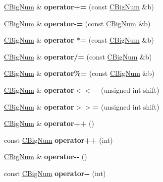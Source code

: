 \begin{DoxyCompactItemize}
\mbox{\hyperlink{class_c_big_num}{C\+Big\+Num}} \& {\bfseries operator+=} (const \mbox{\hyperlink{class_c_big_num}{C\+Big\+Num}} \&b)
\item 
\mbox{\label{class_c_big_num_a4fe724fd22129eefc4e1f34d95505381}} 
\mbox{\hyperlink{class_c_big_num}{C\+Big\+Num}} \& {\bfseries operator-\/=} (const \mbox{\hyperlink{class_c_big_num}{C\+Big\+Num}} \&b)
\item 
\mbox{\label{class_c_big_num_adc516b532cc017ad5c33c1a2e027e743}} 
\mbox{\hyperlink{class_c_big_num}{C\+Big\+Num}} \& {\bfseries operator $\ast$=} (const \mbox{\hyperlink{class_c_big_num}{C\+Big\+Num}} \&b)
\item 
\mbox{\label{class_c_big_num_a213f7dc5a2d8212d3e7402a06ee5d5b9}} 
\mbox{\hyperlink{class_c_big_num}{C\+Big\+Num}} \& {\bfseries operator/=} (const \mbox{\hyperlink{class_c_big_num}{C\+Big\+Num}} \&b)
\item 
\mbox{\label{class_c_big_num_ac5bec8d967502c15e2dffc8600c933e6}} 
\mbox{\hyperlink{class_c_big_num}{C\+Big\+Num}} \& {\bfseries operator\%=} (const \mbox{\hyperlink{class_c_big_num}{C\+Big\+Num}} \&b)
\item 
\mbox{\label{class_c_big_num_a784951e3a24199fa6b994a951453d156}} 
\mbox{\hyperlink{class_c_big_num}{C\+Big\+Num}} \& {\bfseries operator$<$$<$=} (unsigned int shift)
\item 
\mbox{\label{class_c_big_num_a7d2759e104a02502891b185dfb704ad1}} 
\mbox{\hyperlink{class_c_big_num}{C\+Big\+Num}} \& {\bfseries operator$>$$>$=} (unsigned int shift)
\item 
\mbox{\label{class_c_big_num_ac9421f22614796d8520be7e6ade71ee8}} 
\mbox{\hyperlink{class_c_big_num}{C\+Big\+Num}} \& {\bfseries operator++} ()
\item 
\mbox{\label{class_c_big_num_aa69e12c7f330374b2d86df0da0627e58}} 
const \mbox{\hyperlink{class_c_big_num}{C\+Big\+Num}} {\bfseries operator++} (int)
\item 
\mbox{\label{class_c_big_num_a47920287946fb3a55e84af70e953e78f}} 
\mbox{\hyperlink{class_c_big_num}{C\+Big\+Num}} \& {\bfseries operator-\/-\/} ()
\item 
\mbox{\label{class_c_big_num_a13d365561d5407fc624eacb6378db4d3}} 
const \mbox{\hyperlink{class_c_big_num}{C\+Big\+Num}} {\bfseries operator-\/-\/} (int)
\end{DoxyCompactItemize}
